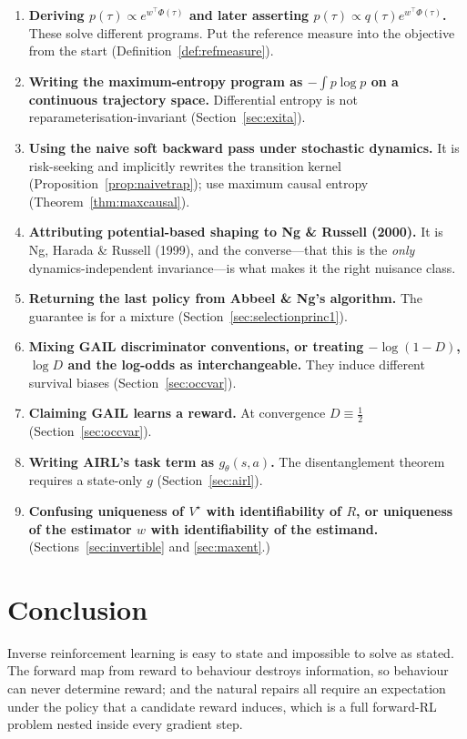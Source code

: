 \documentclass[11pt]{article}
\theoremstyle{plain}
\theoremstyle{definition}
\theoremstyle{remark}
\begin{document}
\begin{enumerate}
\item \textbf{Deriving $p(\tau)\propto e^{w^\top\Phi(\tau)}$ and later
asserting $p(\tau)\propto q(\tau)e^{w^\top\Phi(\tau)}$.} These solve
different programs. Put the reference measure into the objective from the
start (Definition~\ref{def:refmeasure}).
\item \textbf{Writing the maximum-entropy program as $-\int p\log p$ on a
continuous trajectory space.} Differential entropy is not
reparameterisation-invariant (Section~\ref{sec:exita}).
\item \textbf{Using the naive soft backward pass under stochastic
dynamics.} It is risk-seeking and implicitly rewrites the transition
kernel (Proposition~\ref{prop:naivetrap}); use maximum causal entropy
(Theorem~\ref{thm:maxcausal}).
\item \textbf{Attributing potential-based shaping to Ng \& Russell
(2000).} It is Ng, Harada \& Russell (1999), and the converse---that this
is the \emph{only} dynamics-independent invariance---is what makes it the
right nuisance class.
\item \textbf{Returning the last policy from Abbeel \& Ng's algorithm.}
The guarantee is for a mixture (Section~\ref{sec:selectionprinc1}).
\item \textbf{Mixing GAIL discriminator conventions, or treating
$-\log(1-D)$, $\log D$ and the log-odds as interchangeable.} They induce
different survival biases (Section~\ref{sec:occvar}).
\item \textbf{Claiming GAIL learns a reward.} At convergence $D\equiv
\frac12$ (Section~\ref{sec:occvar}).
\item \textbf{Writing AIRL's task term as $g_\theta(s,a)$.} The
disentanglement theorem requires a state-only $g$ (Section~\ref{sec:airl}).
\item \textbf{Confusing uniqueness of $V^\star$ with identifiability of
$R$, or uniqueness of the estimator $w$ with identifiability of the
estimand.} (Sections~\ref{sec:invertible} and \ref{sec:maxent}.)
\end{enumerate}

\section{Conclusion}

Inverse reinforcement learning is easy to state and impossible to solve as
stated. The forward map from reward to behaviour destroys information, so
behaviour can never determine reward; and the natural repairs all require
an expectation under the policy that a candidate reward induces, which is
a full forward-RL problem nested inside every gradient step.
\end{document}
